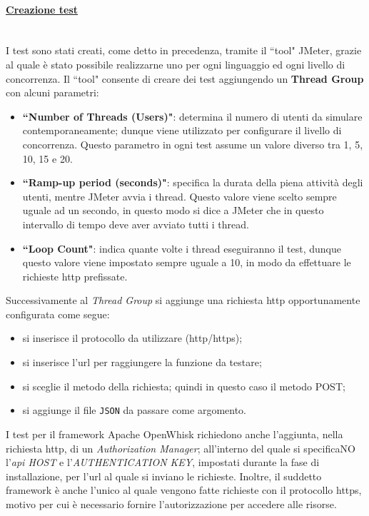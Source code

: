 \documentclass[12pt,a4paper,openany,twoside]{book}
\begin{document}
\paragraph{\underline{Creazione test}} ~\\
I test sono stati creati, come detto in precedenza, tramite il ``tool" JMeter, grazie al quale è stato possibile realizzarne uno per ogni linguaggio ed ogni livello di concorrenza.
Il ``tool" consente di creare dei test aggiungendo un \textbf{Thread Group} con alcuni parametri:
\begin{itemize}
    \item \textbf{``Number of Threads (Users)"}: determina il numero di utenti da simulare contemporaneamente; dunque viene utilizzato per configurare il livello di concorrenza. Questo parametro in ogni test assume un valore diverso tra 1, 5, 10, 15 e 20.
    
    \item \textbf{``Ramp-up period (seconds)"}: specifica la durata della piena attività degli utenti, mentre JMeter avvia i thread. Questo valore viene scelto sempre uguale ad un secondo, in questo modo si dice a JMeter che in questo intervallo di tempo deve aver avviato tutti i thread.
    
    \item \textbf{``Loop Count"}: indica quante volte i thread eseguiranno il test, dunque questo valore viene impostato sempre uguale a 10, in modo da effettuare le richieste \ac{http} prefissate.
\end{itemize}
Successivamente al \textit{Thread Group} si aggiunge una richiesta \ac{http} opportunamente configurata come segue:
\begin{itemize}
    \item si inserisce il protocollo da utilizzare (\ac{http}/\ac{https});
    
    \item si inserisce l'\ac{url} per raggiungere la funzione da testare;
    
    \item si sceglie il metodo della richiesta; quindi in questo caso il metodo POST;
    
    \item si aggiunge il file \texttt{JSON} da passare come argomento.
\end{itemize}

\noindent
I test per il framework Apache OpenWhisk richiedono anche l'aggiunta, nella richiesta \ac{http}, di un \textit{Authorization Manager}; all'interno del quale si specificaNO l'\textit{\ac{api} HOST} e l'\textit{AUTHENTICATION KEY}, impostati durante la fase di installazione, per l'\ac{url} al quale si inviano le richieste. Inoltre, il suddetto framework è anche l'unico al quale vengono fatte richieste con il protocollo \ac{https}, motivo per cui è necessario fornire l'autorizzazione per accedere alle risorse.
\end{document}
